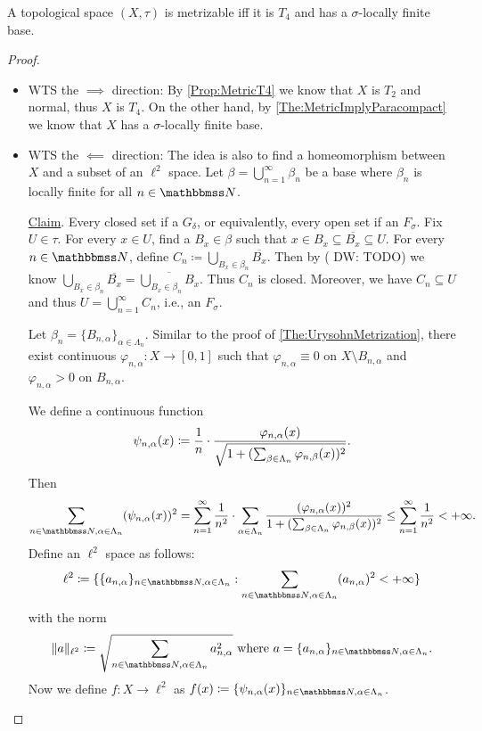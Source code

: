 \documentclass[screen,single]{techreport}
\numberwithin{equation}{section}
\newcommand{\diw}[1]{{\color{Red} DW: #1}}
\begin{document}
\begin{theorem}\label{The:NagataSmirnov}
  A topological space $(X,\tau)$ is metrizable iff it is $T_4$ and has a $\sigma$-locally finite base.
\end{theorem}
\begin{proof}\
  \begin{itemize}
    \item WTS the $\implies$ direction: By \cref{Prop:MetricT4} we know that $X$ is $T_2$ and normal, thus $X$ is $T_4$.
    On the other hand, by \cref{The:MetricImplyParacompact} we know that $X$ has a $\sigma$-locally finite base.
    \item WTS the $\impliedby$ direction: The idea is also to find a homeomorphism between $X$ and a subset of an $\ell^2$ space.
    Let $\beta = \bigcup_{n=1}^\infty \beta_n$ be a base where $\beta_n$ is locally finite for all $n \in \bbN$.
    
    \underline{Claim}. Every closed set if a $G_\delta$, or equivalently, every open set if an $F_\sigma$.
    Fix $U \in \tau$.
    For every $x \in U$, find a $B_x \in \beta$ such that $x \in B_x \subseteq \overline{B_x} \subseteq U$.
    For every $n \in \bbN$, define $C_n \coloneqq \bigcup_{B_x \in \beta_n} \overline{B_x}$.
    Then by (\diw{TODO}) we know $\bigcup_{B_x \in \beta_n} \overline{B_x} = \overline{\bigcup_{B_x \in \beta_n} B_x}$.
    Thus $C_n$ is closed.
    Moreover, we have $C_n \subseteq U$ and thus $U = \bigcup_{n=1}^\infty C_n$, i.e., an $F_\sigma$.
    
    Let $\beta_n = \{B_{n,\alpha}\}_{\alpha \in \Lambda_n}$. Similar to the proof of \cref{The:UrysohnMetrization}, there exist continuous $\varphi_{n,\alpha} : X \to [0,1]$ such that $\varphi_{n,\alpha} \equiv 0$ on $X \setminus B_{n,\alpha}$ and $\varphi_{n,\alpha} >0$ on $B_{n,\alpha}$.
    
    We define a continuous function
    \[
    \psi_{n,\alpha}(x) \coloneqq \frac{1}{n} \cdot \frac{\varphi_{n,\alpha}(x)}{\sqrt{1 + ({ \sum_{\beta \in \Lambda_n} \varphi_{n,\beta}(x)})^2}}.
    \]
    Then
    \[
    \sum_{n \in \bbN, \alpha \in \Lambda_n} \p{ \psi_{n,\alpha}(x)}^2 = \sum_{n=1}^\infty \frac{1}{n^2} \cdot \sum_{\alpha \in \Lambda_n}  \frac{\p{\varphi_{n,\alpha}(x)}^2}{1 + \p{ \sum_{\beta \in \Lambda_n} \varphi_{n,\beta}(x)}^2} \le \sum_{n=1}^\infty \frac{1}{n^2} < +\infty. 
    \]
    Define an $\ell^2$ space as follows:
    \[
    \ell^2 \coloneqq \set{ \{ a_{n,\alpha}\} _{n \in \bbN,\alpha\in \Lambda_n} : \sum_{n \in \bbN,\alpha \in \Lambda_n} \p{a_{n,\alpha}}^2 < +\infty }
    \]
    with the norm
    \[
    \norm{a }_{\ell^2} \coloneqq \sqrt{\sum_{n\in\bbN, \alpha \in \Lambda_n} a_{n,\alpha}^2 } ~\text{where}~a = \{a_{n,\alpha}\}_{n \in \bbN,\alpha \in \Lambda_n}.
    \]
    Now we define $f : X \to \ell^2$ as $f(x) \coloneqq \{ \psi_{n,\alpha}(x)\}_{n \in \bbN,\alpha \in \Lambda_n}$.
    

\end{itemize}
\end{proof}
\end{document}
